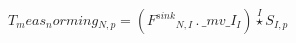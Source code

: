 \documentclass[border=2pt]{standalone}
\begin{document}
${T_meas_norming}{_{N, p}}=\left({{F^{sink}}}{_{N, I}} \, . \, {\_mv\_I}{_{I}}\right) \stackrel{I}{\star} {{S}}{_{I, p}}$
\end{document}
